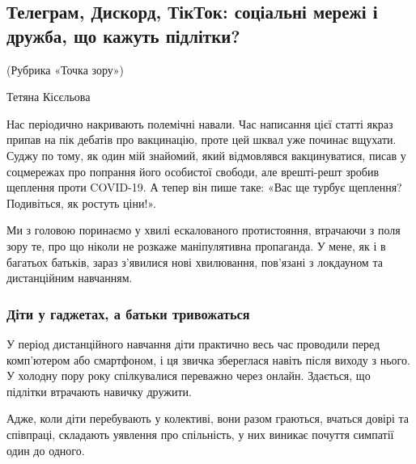 
 
 
 
 
\subsection{Телеграм, Дискорд, ТікТок: соціальні мережі і дружба, що кажуть підлітки?}
\label{sec:24_12_2021.stz.news.ua.radiosvoboda.1.podrostki_tiktok_psihologia}


(Рубрика «Точка зору»)

Тетяна Кісєльова

Нас періодично накривають полемічні навали. Час написання цієї статті якраз
припав на пік дебатів про вакцинацію, проте цей шквал уже починає вщухати.
Суджу по тому, як один мій знайомий, який відмовлявся вакцинуватися, писав у
соцмережах про попрання його особистої свободи, але врешті-решт зробив щеплення
проти COVID-19. А тепер він пише таке: «Вас ще турбує щеплення? Подивіться, як
ростуть ціни!».

Ми з головою поринаємо у хвилі ескалованого протистояння, втрачаючи з поля зору
те, про що ніколи не розкаже маніпулятивна пропаганда. У мене, як і в багатьох
батьків, зараз з’явилися нові хвилювання, пов’язані з локдауном та дистанційним
навчанням.


\subsubsection{Діти у гаджетах, а батьки тривожаться}

У період дистанційного навчання діти практично весь час проводили перед
комп’ютером або смартфоном, і ця звичка збереглася навіть після виходу з нього.
У холодну пору року спілкувалися переважно через онлайн. Здається, що підлітки
втрачають навичку дружити.

Адже, коли діти перебувають у колективі, вони разом граються, вчаться довірі та
співпраці, складають уявлення про спільність, у них виникає почуття симпатії
один до одного.

